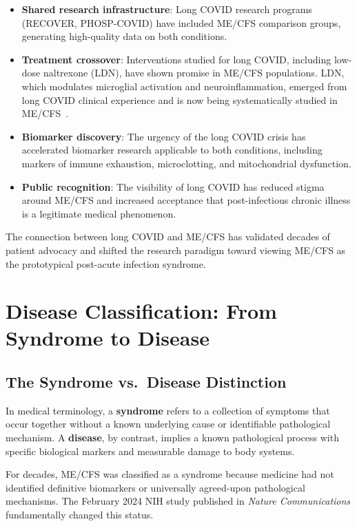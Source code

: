 \begin{itemize}
    \item \textbf{Shared research infrastructure}: Long COVID research programs (RECOVER, PHOSP-COVID) have included ME/CFS comparison groups, generating high-quality data on both conditions.
    \item \textbf{Treatment crossover}: Interventions studied for long COVID, including low-dose naltrexone (LDN), have shown promise in ME/CFS populations. LDN, which modulates microglial activation and neuroinflammation, emerged from long COVID clinical experience and is now being systematically studied in ME/CFS~\cite{Bolton2020LDN}.
    \item \textbf{Biomarker discovery}: The urgency of the long COVID crisis has accelerated biomarker research applicable to both conditions, including markers of immune exhaustion, microclotting, and mitochondrial dysfunction.
    \item \textbf{Public recognition}: The visibility of long COVID has reduced stigma around ME/CFS and increased acceptance that post-infectious chronic illness is a legitimate medical phenomenon.
\end{itemize}

The connection between long COVID and ME/CFS has validated decades of patient advocacy and shifted the research paradigm toward viewing ME/CFS as the prototypical post-acute infection syndrome.

\section{Disease Classification: From Syndrome to Disease}
\label{sec:disease-classification}

\subsection{The Syndrome vs.\ Disease Distinction}
\label{subsec:syndrome-disease}

In medical terminology, a \textbf{syndrome} refers to a collection of symptoms that occur together without a known underlying cause or identifiable pathological mechanism. A \textbf{disease}, by contrast, implies a known pathological process with specific biological markers and measurable damage to body systems.

For decades, ME/CFS was classified as a syndrome because medicine had not identified definitive biomarkers or universally agreed-upon pathological mechanisms. The February 2024 NIH study published in \emph{Nature Communications} fundamentally changed this status.


